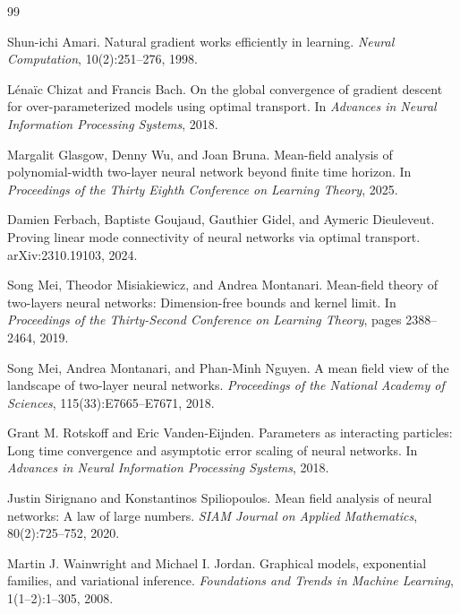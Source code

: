 \documentclass[11pt]{article}
\theoremstyle{definition}
\begin{document}
\begin{thebibliography}{99}

Shun-ichi Amari.
\newblock Natural gradient works efficiently in learning.
\newblock \emph{Neural Computation}, 10(2):251--276, 1998.

L\'ena\"ic Chizat and Francis Bach.
\newblock On the global convergence of gradient descent for over-parameterized
models using optimal transport.
\newblock In \emph{Advances in Neural Information Processing Systems}, 2018.

Margalit Glasgow, Denny Wu, and Joan Bruna.
\newblock Mean-field analysis of polynomial-width two-layer neural network
beyond finite time horizon.
\newblock In \emph{Proceedings of the Thirty Eighth Conference on Learning
Theory}, 2025.

Damien Ferbach, Baptiste Goujaud, Gauthier Gidel, and Aymeric Dieuleveut.
\newblock Proving linear mode connectivity of neural networks via optimal
transport.
\newblock arXiv:2310.19103, 2024.

Song Mei, Theodor Misiakiewicz, and Andrea Montanari.
\newblock Mean-field theory of two-layers neural networks: Dimension-free
bounds and kernel limit.
\newblock In \emph{Proceedings of the Thirty-Second Conference on Learning
Theory}, pages 2388--2464, 2019.

Song Mei, Andrea Montanari, and Phan-Minh Nguyen.
\newblock A mean field view of the landscape of two-layer neural networks.
\newblock \emph{Proceedings of the National Academy of Sciences},
115(33):E7665--E7671, 2018.

Grant M. Rotskoff and Eric Vanden-Eijnden.
\newblock Parameters as interacting particles: Long time convergence and
asymptotic error scaling of neural networks.
\newblock In \emph{Advances in Neural Information Processing Systems}, 2018.

Justin Sirignano and Konstantinos Spiliopoulos.
\newblock Mean field analysis of neural networks: A law of large numbers.
\newblock \emph{SIAM Journal on Applied Mathematics}, 80(2):725--752, 2020.

Martin J. Wainwright and Michael I. Jordan.
\newblock Graphical models, exponential families, and variational inference.
\newblock \emph{Foundations and Trends in Machine Learning}, 1(1--2):1--305,
2008.

\end{thebibliography}
\end{document}
